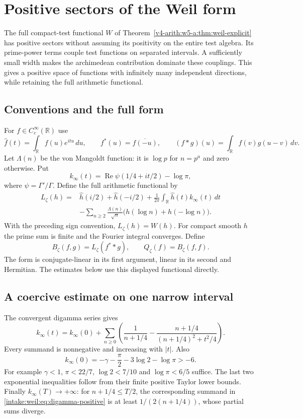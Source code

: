 \section{Positive sectors of the Weil form}
\label{intake:weil:section}

The full compact-test functional $W$ of
Theorem~\ref{v4-arith:w5-a:thm:weil-explicit} has positive sectors
without assuming its positivity on the entire test algebra.
Its prime-power terms couple test functions on separated intervals.
A sufficiently small width makes the archimedean contribution dominate these couplings.
This gives a positive space of functions with infinitely many independent directions,
while retaining the full arithmetic functional.

\subsection{Conventions and the full form}
For $f\in C_c^\infty(\mathbb R)$ use
\[
 \widehat f(t)=\int_\mathbb R f(u)e^{itu}\,du,\qquad
 f^*(u)=\overline{f(-u)},\qquad
 (f*g)(u)=\int_\mathbb R f(v)g(u-v)\,dv.
\]
Let $\Lambda(n)$ be the von Mangoldt function: it is $\log p$ for $n=p^a$ and zero otherwise. Put
\[
 k_\infty(t)=\operatorname{Re}\psi(1/4+it/2)-\log\pi,
\]
where $\psi=\Gamma'/\Gamma$. Define the full arithmetic functional by
\begin{equation}\label{intake:weil:eq:Weil}
\begin{split}
 L_\zeta(h)={}&\widehat h(i/2)+\widehat h(-i/2)
 +\frac1{2\pi}\int_\mathbb R\widehat h(t)k_\infty(t)\,dt\\
 &-\sum_{n\ge2}\frac{\Lambda(n)}{\sqrt n}
          \bigl(h(\log n)+h(-\log n)\bigr).
\end{split}
\end{equation}
With the preceding sign convention, $L_\zeta(h)=W(h)$.
For compact smooth $h$ the prime sum is finite and the Fourier integral converges. Define
\[
 B_\zeta(f,g)=L_\zeta(f^**g),\qquad Q_\zeta(f)=B_\zeta(f,f).
\]
The form is conjugate-linear in its first argument, linear in its second and Hermitian. The estimates below use this displayed functional directly.

\subsection{A coercive estimate on one narrow interval}
The convergent digamma series gives
\begin{equation}\label{intake:weil:eq:digamma-positive}
 k_\infty(t)=k_\infty(0)+\sum_{n\ge0}
 \left(\frac1{n+1/4}
 -\frac{n+1/4}{(n+1/4)^2+t^2/4}\right).
\end{equation}
Every summand is nonnegative and increasing with $|t|$. Also
\[
 k_\infty(0)=-\gamma-\frac\pi2-3\log2-\log\pi>-6.
\]
For example $\gamma<1$, $\pi<22/7$, $\log2<7/10$ and $\log\pi<6/5$ suffice. The last two exponential inequalities follow from their finite positive Taylor lower bounds. Finally $k_\infty(T)\to+\infty$: for $n+1/4\le T/2$, the corresponding summand in \eqref{intake:weil:eq:digamma-positive} is at least $1/(2(n+1/4))$, whose partial sums diverge.

